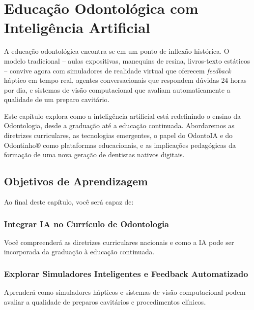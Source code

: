 \chapter{Educação Odontológica com Inteligência Artificial}
\label{cap:educacao-odontologica-ia}

\nivelquatro

A educação odontológica encontra-se em um ponto de inflexão histórica. O modelo
tradicional -- aulas expositivas, manequins de resina, livros-texto estáticos --
convive agora com simuladores de realidade virtual que oferecem \textit{feedback}
háptico em tempo real, agentes conversacionais que respondem dúvidas 24 horas
por dia, e sistemas de visão computacional que avaliam automaticamente a
qualidade de um preparo cavitário.

Este capítulo explora como a inteligência artificial está redefinindo o ensino
da Odontologia, desde a graduação até a educação continuada. Abordaremos as
diretrizes curriculares, as tecnologias emergentes, o papel do OdontoIA e do
Odontinho® como plataformas educacionais, e as implicações pedagógicas da
formação de uma nova geração de dentistas nativos digitais.

 
 

\section{Objetivos de Aprendizagem}

Ao final deste capítulo, você será capaz de:

\subsection{Integrar IA no Currículo de Odontologia}
Você compreenderá as diretrizes curriculares nacionais e como a IA pode ser incorporada da graduação à educação continuada.

\subsection{Explorar Simuladores Inteligentes e Feedback Automatizado}
Aprenderá como simuladores hápticos e sistemas de visão computacional podem avaliar a qualidade de preparos cavitários e procedimentos clínicos.

